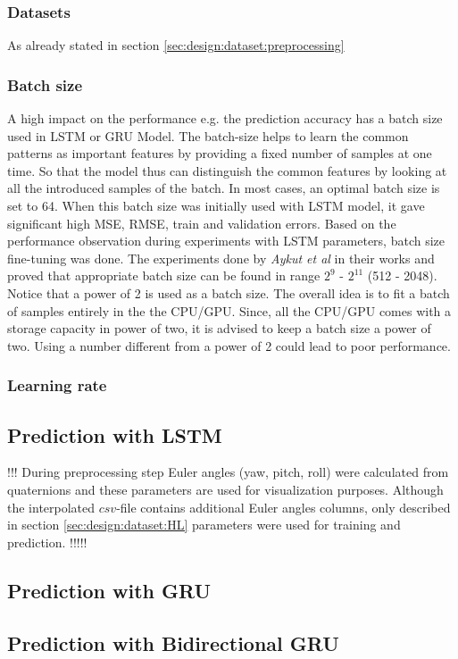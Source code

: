\subsubsection{Datasets}
\label{sec:eval:experiments:early:ds}
As already stated in section \ref{sec:design:dataset:preprocessing}

\subsubsection{Batch size}
\label{sec:eval:experiments:early:batch}
A high impact on the performance e.g. the prediction accuracy has a batch size used in LSTM or GRU Model. The batch-size helps to learn the common patterns as important features by providing a fixed number of samples at one time. So that the model thus can distinguish the common features by looking at all the introduced samples of the batch. In most cases, an optimal batch size is set to 64. When this batch size was initially used with LSTM model, it gave significant high MSE, RMSE, train and validation errors. Based on the performance observation during experiments with LSTM parameters, batch size fine-tuning was done. The experiments done by \textit{Aykut et al} in their works \cite{delay_compensation_360} and \cite{telepresence} proved that appropriate batch size can be found in range $2^{9}$ - $2^{11}$ (512 - 2048). Notice that a power of 2 is used as a batch size. The overall idea is to fit a batch of samples entirely in the the CPU/GPU. Since, all the CPU/GPU comes with a storage capacity in power of two, it is advised to keep a batch size a power of two. Using a number different from a power of 2 could lead to poor performance.

\subsubsection{Learning rate}
\label{sec:eval:experiments:early:lr}

\subsection{Prediction with LSTM}
\label{sec:eval:experiments:lstm}
!!!
During preprocessing step Euler angles (yaw, pitch, roll) were calculated from quaternions and these parameters are used for visualization purposes. Although the interpolated $csv$-file contains additional Euler angles columns, only described in section \ref{sec:design:dataset:HL} parameters were used for training and prediction.
!!!!!



\subsection{Prediction with GRU}
\label{sec:eval:experiments:gru}

\subsection{Prediction with Bidirectional GRU}
\label{sec:eval:experiments:bi-gru}